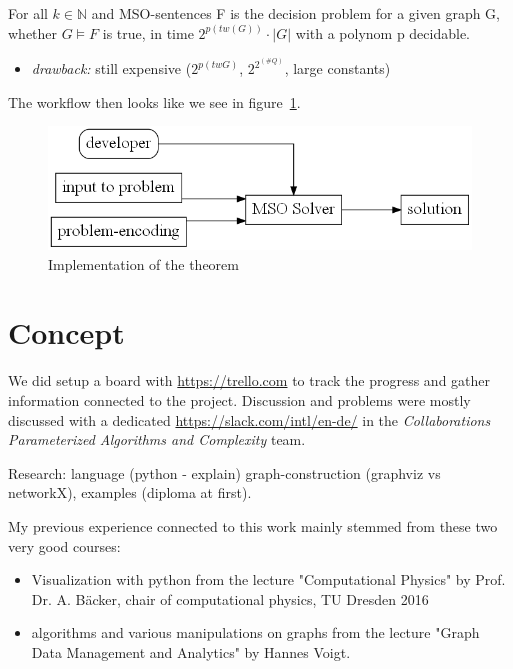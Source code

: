 \documentclass[a4paper, 12pt]{scrartcl}
\begin{document}
For all $k \in \mathbb{N}$ and MSO-sentences F is the decision problem for a given graph G, whether $G \models F$ is true, in time $2^{p(tw(G))} \cdot |G|$ with a polynom p decidable.
\begin{itemize}
	
	\item \emph{drawback:} still expensive ($2^{p(tw G)}$, $2^{2^{(\#Q)}}$, large constants) \smallskip 

\end{itemize}

The workflow then looks like we see in figure~\ref{fig:UsageCourcelle}.

\begin{figure}[H]
	\includegraphics[height=0.2\textheight]{images/UsageCourcelle.gv.png}
	\caption{Implementation of the theorem}
	\label{fig:UsageCourcelle}
\end{figure}
\newpage
\section{Concept}
We did setup a board with \url{https://trello.com} to track the progress and gather information connected to the project.
Discussion and problems were mostly discussed with a dedicated \href{slack channel}{https://slack.com/intl/en-de/} in the \emph{Collaborations Parameterized Algorithms and Complexity} team.

Research: language (python - explain) graph-construction (graphviz vs networkX), examples (diploma at first). 

My previous experience connected to this work mainly stemmed from these two very good courses:
\begin{itemize}
	\item Visualization with python from the lecture "Computational Physics" by Prof. Dr. A. Bäcker,
	chair of computational physics, TU Dresden 2016
	\item algorithms and various manipulations on graphs from the lecture "Graph Data Management and Analytics" by Hannes Voigt. \cite{VLGDMA}
\end{itemize}
\end{document}
